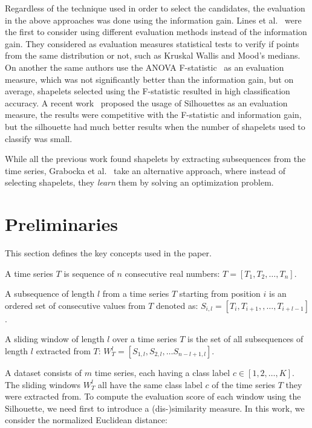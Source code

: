 \documentclass[sigconf, nonacm]{acmart}
\begin{document}
Regardless of the technique used in order to select the candidates, the
evaluation in the above approaches was done using the information gain.
Lines et al.~\cite{alternative_measures} were the first to consider using
different evaluation methods instead of the information gain. They considered
as evaluation measures statistical tests to verify if points from the same
distribution or not, such as Kruskal Wallis and Mood's medians. On another
the same authors use the ANOVA F-statistic~\cite{shapelet_transform} as an
evaluation measure, which was not significantly better than the information
gain, but on average, shapelets selected using the F-statistic resulted in high
classification accuracy.
A recent work~\cite{silhoutte_shapelets} proposed the usage of Silhouettes
\cite{silhouettes} as an evaluation measure, the results were competitive with
the F-statistic and information gain, but the silhouette had much better results
when the number of shapelets used to classify was small.

While all the previous work found shapelets by extracting subsequences from the
time series, Grabocka et al.~\cite{learning_shapelets} take an alternative
approach, where instead of selecting shapelets, they \emph{learn} them by
solving an optimization problem.


\section{Preliminaries}
This section defines the key concepts used in the paper.
\begin{definition}
	A time series $T$ is sequence of $n$ consecutive real numbers:
	$T = [T_1, T_2, \dots, T_n]$.
\end{definition}

\begin{definition}[Subsequence]
	A subsequence of length $l$ from a time series $T$ starting from position $i$
	is an ordered set of consecutive values from $T$ denoted as:
	$S_{i, l} = [T_i, T_{i+1},, \dots, T_{i+l-1}]$.
\end{definition}

\begin{definition}
	A sliding window of length $l$ over a time series $T$ is the set of
	all subsequences of length $l$ extracted from $T$:
	$W_T^l = [S_{1, l}, S_{2, l}, \dots S_{n-l+1, l}]$.
\end{definition}

A dataset consists of $m$ time series, each having a class label $c \in [1, 2,
		\dots, K]$. The sliding windows $W_T^l$ all have the same class label $c$ of the
time series $T$ they were extracted from. To compute the evaluation score of
each window using the Silhouette, we need first to introduce a (dis-)similarity
measure. In this work, we consider the normalized Euclidean distance:
\end{document}
